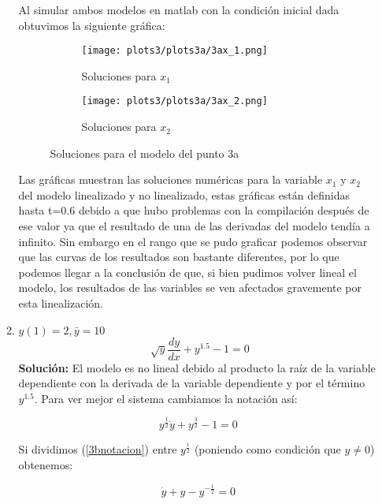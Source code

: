 \documentclass[letterpaper, 12pt]{article}
\begin{document}
\begin{enumerate}
\begin{enumerate}
Al simular ambos modelos en matlab con la condición inicial dada obtuvimos la siguiente gráfica:
\begin{figure}[H]
    \centering
    \begin{subfigure}[H]{0.45\linewidth}
        \texttt{[image: plots3/plots3a/3ax\_1.png]}
        \caption{\centering Soluciones para $x_1$}
        \label{}
    \end{subfigure}
    \hspace{0.5cm}
    \begin{subfigure}[H]{0.45\linewidth}
        \texttt{[image: plots3/plots3a/3ax\_2.png]}
        \caption{\centering Soluciones para $x_2$}
        \label{fig:config 2}
    \end{subfigure}
    \caption{Soluciones para el modelo del punto 3a}
\end{figure}

Las gráficas muestran las soluciones numéricas para la variable $x_1$ y $x_2$ del modelo linealizado y no linealizado, estas gráficas están definidas hasta t=0.6 debido a que hubo problemas con la compilación después de ese valor ya que el resultado de una de las derivadas del modelo tendía a infinito. Sin embargo en el rango que se pudo graficar podemos observar que las curvas de los resultados son bastante diferentes, por lo que podemos llegar a la conclusión de que, si bien pudimos volver lineal el modelo, los resultados de las variables se ven afectados gravemente por esta linealización.



\item $y(1)=2,\bar{y}=10$
\begin{equation}
     \sqrt[]{y}\frac{dy}{dx}+y^{1.5}-1 = 0
\end{equation}
\textbf{Solución:}
El modelo es no lineal debido al producto la raíz de la variable dependiente con la derivada de la variable dependiente y por el término $y^{1.5}$.
Para ver mejor el sistema cambiamos la notación así:

\begin{equation}
     y^{\frac{1}{2}}\dot{y}+y^{\frac{3}{2}}-1 = 0
     \label{3bnotacion}
\end{equation}

Si dividimos (\ref{3bnotacion}) entre $y^{\frac{1}{2}}$ (poniendo como condición que $y\neq0$) obtenemos:

\begin{equation}
     \dot{y}+y-y^{-\frac{1}{2}} = 0
     \label{3bdivid}
\end{equation}


\end{enumerate}
\end{enumerate}
\end{document}
